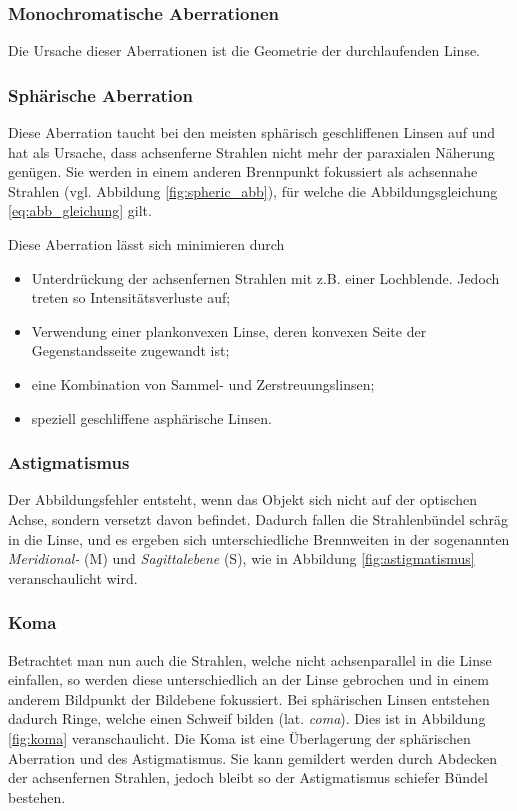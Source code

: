 \subsubsection{Monochromatische Aberrationen}
Die Ursache dieser Aberrationen ist die Geometrie der durchlaufenden Linse.

\subsubsection*{Sphärische Aberration}
Diese Aberration taucht bei den meisten sphärisch geschliffenen Linsen auf und hat als Ursache, dass achsenferne Strahlen nicht mehr der paraxialen Näherung genügen. Sie werden in einem anderen Brennpunkt fokussiert als achsennahe Strahlen (vgl. Abbildung \ref{fig:spheric_abb}), für welche die Abbildungsgleichung \eqref{eq:abb_gleichung} gilt.

Diese Aberration lässt sich minimieren durch
\begin{itemize}
	\item Unterdrückung der achsenfernen Strahlen mit z.B. einer Lochblende. Jedoch treten so Intensitätsverluste auf;
	\item Verwendung einer plankonvexen Linse, deren konvexen Seite der Gegenstandsseite zugewandt ist;
	\item eine Kombination von Sammel- und Zerstreuungslinsen;
	\item speziell geschliffene asphärische Linsen.
\end{itemize}

\subsubsection*{Astigmatismus}
Der Abbildungsfehler entsteht, wenn das Objekt sich nicht auf der optischen Achse, sondern versetzt davon befindet. Dadurch fallen die Strahlenbündel schräg in die Linse, und es ergeben sich unterschiedliche Brennweiten in der sogenannten \emph{Meridional-} (M) und \emph{Sagittalebene} (S), wie in Abbildung \ref{fig:astigmatismus} veranschaulicht wird.

\subsubsection*{Koma}
Betrachtet man nun auch die Strahlen, welche nicht achsenparallel in die Linse einfallen, so werden diese unterschiedlich an der Linse gebrochen und in einem anderem Bildpunkt der Bildebene fokussiert. Bei sphärischen Linsen entstehen dadurch Ringe, welche einen Schweif bilden (lat. \emph{coma}). Dies ist in Abbildung \ref{fig:koma} veranschaulicht. Die Koma ist eine Überlagerung der sphärischen Aberration und des Astigmatismus.
Sie kann gemildert werden durch Abdecken der achsenfernen Strahlen, jedoch bleibt so der Astigmatismus schiefer Bündel bestehen.

